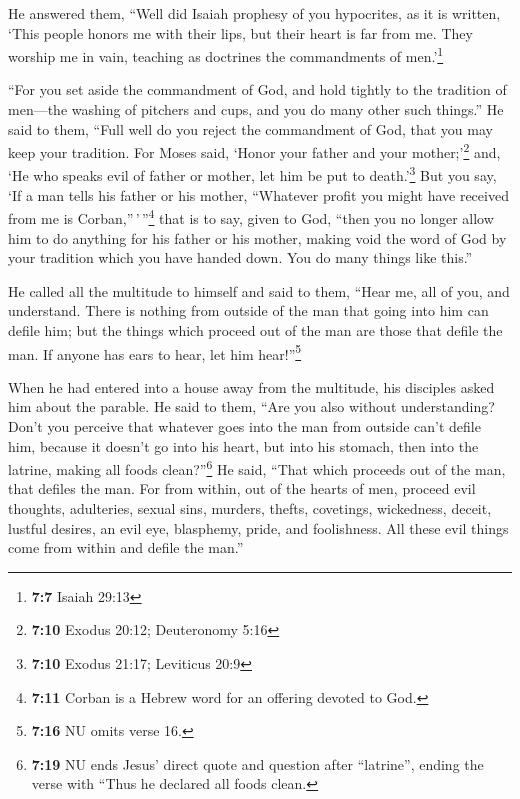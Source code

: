 He answered them, ``Well did Isaiah prophesy of you
hypocrites, as it is written, `This people honors me with their lips,
but their heart is far from me.  They worship me in vain,
teaching as doctrines the commandments of men.'\footnote{\textbf{7:7}
  Isaiah 29:13}

 ``For you set aside the commandment of God, and hold
tightly to the tradition of men---the washing of pitchers and cups, and
you do many other such things.''  He said to them, ``Full
well do you reject the commandment of God, that you may keep your
tradition.  For Moses said, `Honor your father and your
mother;'\footnote{\textbf{7:10} Exodus 20:12; Deuteronomy 5:16} and, `He
who speaks evil of father or mother, let him be put to
death.'\footnote{\textbf{7:10} Exodus 21:17; Leviticus 20:9}
 But you say, `If a man tells his father or his mother,
``Whatever profit you might have received from me is
Corban,''\,'\,''\footnote{\textbf{7:11} Corban is a Hebrew word for an
  offering devoted to God.} that is to say, given to God,
 ``then you no longer allow him to do anything for his
father or his mother,  making void the word of God by
your tradition which you have handed down. You do many things like
this.''

 He called all the multitude to himself and said to them,
``Hear me, all of you, and understand.  There is nothing
from outside of the man that going into him can defile him; but the
things which proceed out of the man are those that defile the man.
 If anyone has ears to hear, let him hear!''\footnote{\textbf{7:16}
  NU omits verse 16.}

 When he had entered into a house away from the
multitude, his disciples asked him about the parable.  He
said to them, ``Are you also without understanding? Don't you perceive
that whatever goes into the man from outside can't defile him,
 because it doesn't go into his heart, but into his
stomach, then into the latrine, making all foods clean?''\footnote{\textbf{7:19}
  NU ends Jesus' direct quote and question after ``latrine'', ending the
  verse with ``Thus he declared all foods clean.}  He
said, ``That which proceeds out of the man, that defiles the man.
 For from within, out of the hearts of men, proceed evil
thoughts, adulteries, sexual sins, murders, thefts, 
covetings, wickedness, deceit, lustful desires, an evil eye, blasphemy,
pride, and foolishness.  All these evil things come from
within and defile the man.''

